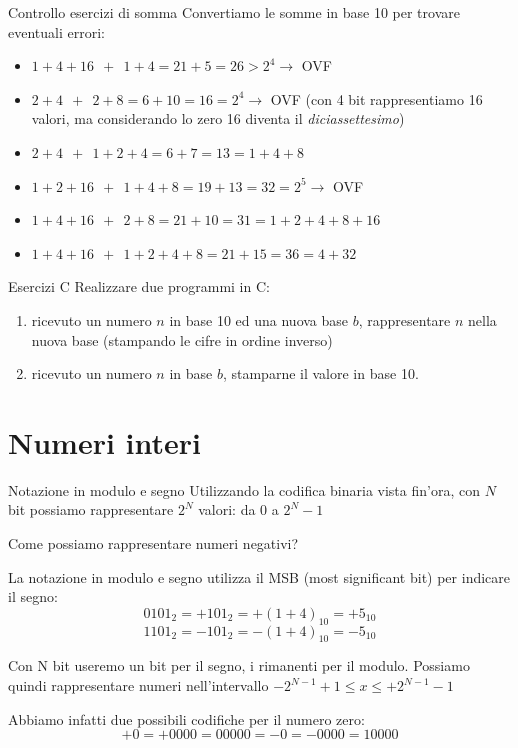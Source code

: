 \documentclass[aspectratio=169, ]{beamer}
\begin{document}
\begin{frame}{Controllo esercizi di somma}
Convertiamo le somme in base 10 per trovare eventuali errori:

\begin{itemize}
\item $1+4+16 \ \ + \ \ 1+4 = 21+5 = 26 > 2^4 \rightarrow$ \alert{OVF}
\item $2+4 \ \ + \ \ 2+8 = 6+10 = 16 = 2^4 \rightarrow$ \alert{OVF} (con 4 bit rappresentiamo 16 valori, ma considerando lo zero 16 diventa il \emph{diciassettesimo})
\item $2+4 \ \ + \ \ 1+2+4 = 6+7 = 13 = 1+4+8$
\item $1+2+16 \ \ + \ \ 1+4+8 = 19+13 = 32 = 2^5 \rightarrow$ \alert{OVF}
\item $1+4+16 \ \ + \ \ 2+8 = 21+10 = 31 = 1+2+4+8+16$
\item $1+4+16 \ \ + \ \ 1+2+4+8 = 21+15 = 36 = 4+32$
\end{itemize}
\end{frame}

\begin{frame}{Esercizi C}
    Realizzare due programmi in C:
    \begin{enumerate}
        \item ricevuto un numero $n$ in base 10 ed una nuova base $b$, rappresentare $n$ nella nuova base (stampando le
            cifre in ordine inverso)
        \item ricevuto un numero $n$ in base $b$, stamparne il valore in base 10.
    \end{enumerate}
\end{frame}

\section{Numeri interi}
\begin{frame}{Notazione in modulo e segno}
Utilizzando la codifica binaria vista fin'ora, con $N$ bit possiamo rappresentare $2^N$ valori: da 0 a $2^N - 1$

Come possiamo rappresentare numeri negativi?

\pause

La notazione in modulo e segno utilizza il \alert{MSB} (most significant bit) per indicare il segno:
\[0101_2 = +101_2 = +(1+4)_{10} = +5_{10}\]
\[1101_2 = -101_2 = -(1+4)_{10} = -5_{10}\]

\pause

Con N bit useremo un bit per il segno, i rimanenti per il modulo.
Possiamo quindi rappresentare numeri nell'intervallo $-2^{N-1}+1 \leq x \leq +2^{N-1}-1$

\pause

Abbiamo infatti due possibili codifiche per il numero zero:
\[+0 = +0000 = 00000
= -0 = -0000 = 10000\]
\end{frame}
\end{document}
